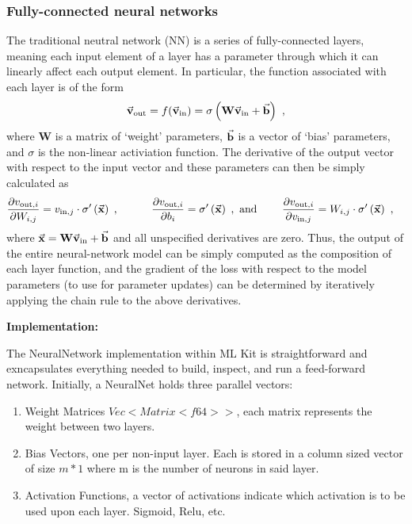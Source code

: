 \subsubsection{Fully-connected neural networks}
The traditional neutral network (NN) is a series of fully-connected layers, meaning each input element of a layer has a parameter through which it can linearly affect each output element.
In particular, the function associated with each layer is of the form \textcolor{blue}{\autocite{Nielsen_2015}}
\begin{equation*}
  \begin{aligned}
    \vec{\mathbf{v}}_{\text{out}} = f(\vec{\mathbf{v}}_{\text{in}}) = \sigma\left(\mathbf{W}\vec{\mathbf{v}}_{\text{in}} + \vec{\mathbf{b}}\right) ~,
  \end{aligned}
\end{equation*}
where $\mathbf{W}$ is a matrix of `weight' parameters, $\vec{\mathbf{b}}$ is a vector of `bias' parameters, and $\sigma$ is the non-linear activiation function.
The derivative of the output vector with respect to the input vector and these parameters can then be simply calculated as
\begin{equation*}
  \begin{aligned}
    \frac{\partial v_{\text{out}, i}}{\partial W_{i, j}} = v_{\text{in}, j} \cdot \sigma'\left(\vec{\mathbf{x}}\right)\hspace{3pt}, \hspace{30pt} \frac{\partial v_{\text{out}, i}}{\partial b_{i}} & = \sigma'\left(\vec{\mathbf{x}}\right)\hspace{3pt},\text{ and} \hspace{23pt} \frac{\partial v_{\text{out}, i}}{\partial v_{\text{in}, j}} = W_{i, j} \cdot \sigma'\left(\vec{\mathbf{x}}\right) ~,
  \end{aligned}
\end{equation*}
where $\vec{\mathbf{x}} = \mathbf{W}\vec{\mathbf{v}}_{\text{in}} + \vec{\mathbf{b}}$ and all unspecified derivatives are zero.
Thus, the output of the entire neural-network model can be simply computed as the composition of each layer function, and the gradient of the loss with respect to the model parameters (to use for parameter updates) can be determined by iteratively applying the chain rule to the above derivatives.

\begin{center}
 \textbf{Implementation:}
\end{center}
The NeuralNetwork implementation within ML Kit is straightforward and exncapsulates everything needed to build, inspect, and run a feed-forward network.
Initially, a NeuralNet holds three parallel vectors: 
\begin{enumerate}
  \item Weight Matrices $Vec<Matrix<f64>>$, each matrix represents the weight between two layers.
  \item Bias Vectors, one per non-input layer. Each is stored in a column sized vector of size $m * 1$ where m is the number of neurons in said layer.
  \item Activation Functions, a vector of activations indicate which activation is to be used upon each layer. Sigmoid, Relu, etc. 
\end{enumerate}

